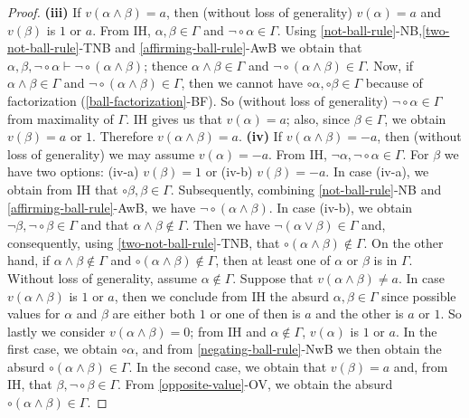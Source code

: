 \documentclass{amsart}
\begin{document}
\begin{proof}
    \textbf{(iii)} If $v(\alpha \land \beta) = a$, then (without loss of generality) $v(\alpha) = a$ and $v(\beta)$ is $1$ or $a$. From IH, $\alpha, \beta \in \Gamma$ and $\lnot \circ \alpha \in \Gamma$. Using \ref{not-ball-rule}-NB,\ref{two-not-ball-rule}-TNB and \ref{affirming-ball-rule}-AwB we obtain that $\alpha, \beta, \lnot \circ \alpha \vdash \lnot \circ(\alpha \land \beta)$; thence $\alpha \land \beta \in \Gamma$ and $\lnot \circ (\alpha \land \beta) \in \Gamma$. Now, if $\alpha \land \beta \in \Gamma$ and $\lnot \circ (\alpha \land \beta) \in \Gamma$, then we cannot have $\circ \alpha, \circ \beta \in \Gamma$ because of factorization (\ref{ball-factorization}-BF). So (without loss of generality) $\lnot \circ \alpha \in \Gamma$ from maximality of $\Gamma$. IH gives us that $v(\alpha) = a$; also, since $\beta \in \Gamma$, we obtain $v(\beta) = a$ or $1$. Therefore $v(\alpha \land \beta) = a$. 
    \textbf{(iv) }If $v(\alpha \land \beta) = -a$, then (without loss of generality) we may assume $v(\alpha) = - a$. From IH, $\lnot \alpha, \lnot \circ \alpha \in \Gamma$. For $\beta$ we have two options: (iv-a) $v(\beta) = 1$ or (iv-b) $v(\beta) = -a$. In case (iv-a), we obtain from IH that $\circ \beta, \beta \in \Gamma$. Subsequently, combining \ref{not-ball-rule}-NB and \ref{affirming-ball-rule}-AwB, we have $\lnot \circ (\alpha \land \beta)$. In case (iv-b), we obtain $\lnot \beta, \lnot \circ \beta \in \Gamma$ and that $\alpha \land \beta \notin \Gamma$. Then we have $\lnot (\alpha \lor \beta) \in \Gamma$ and, consequently, using \ref{two-not-ball-rule}-TNB, that $\circ (\alpha \land \beta) \notin \Gamma$. On the other hand, if $\alpha \land \beta \notin \Gamma$ and $\circ (\alpha \land \beta) \notin \Gamma$, then at least one of $\alpha$ or $\beta$ is in $\Gamma$. Without loss of generality, assume $\alpha \notin \Gamma$. Suppose that $v(\alpha \land \beta) \neq a$. In case $v(\alpha \land \beta)$ is $1$ or $a$, then we conclude from IH the absurd $\alpha, \beta \in \Gamma$ since possible values for $\alpha$ and $\beta$ are either both $1$ or one of then is $a$ and the other is $a$ or $1$. So lastly we consider $v(\alpha \land \beta) = 0$; from IH and $\alpha \notin \Gamma$, $v(\alpha)$ is $1$ or $a$. In the first case, we obtain $\circ \alpha$, and from \ref{negating-ball-rule}-NwB we then obtain the absurd $\circ(\alpha \land \beta) \in \Gamma$. In the second case, we obtain that $v(\beta) = a$ and, from IH, that $\beta, \lnot \circ \beta \in \Gamma$. From \ref{opposite-value}-OV, we obtain the absurd $\circ (\alpha \land \beta) \in \Gamma$.


\end{proof}
\end{document}
